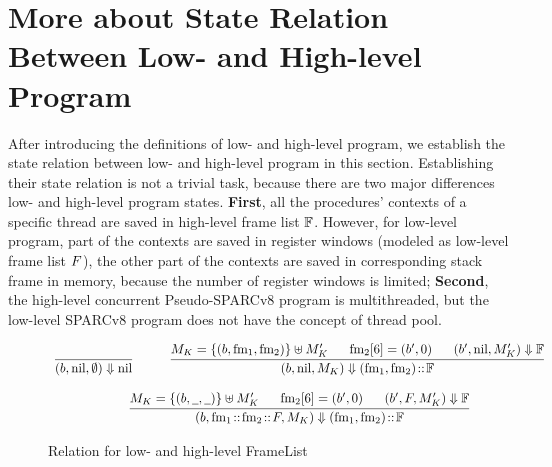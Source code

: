 \section{More about State Relation Between Low- and High-level Program}
\label{sec:more-staterel}

After introducing the definitions of low- and high-level program, 
we establish the state relation between low- and high-level program 
in this section. Establishing their state relation is not a trivial 
task, because there are two major differences low- and high-level 
program states. \textbf{First}, all the procedures' contexts of 
a specific thread are saved in high-level frame list $\mathbb{F}$. 
However, for low-level program, part of the contexts are saved in 
register windows (modeled as low-level frame list $F$), the 
other part of the contexts are saved in corresponding stack frame 
in memory, because the number of register windows is limited; 
\textbf{Second}, the high-level concurrent Pseudo-SPARCv8 program 
is multithreaded, but the low-level SPARCv8 program does not have 
the concept of thread pool. 

\begin{figure}[!h]
    \centering
    \small
    \[
        \begin{array}{c}
            \infer
            {
                \stkRel{(\block, \nil, \emptyset)}{\nil}
            }
            {} \qquad \quad
            \infer
            {
                \stkRel{(\block, \nil, \Mem_K)}{(\fm_1, \fm_2) \stCons \hWstk}
            }
            {
                \Mem_K = \framMem{(\block, \fm_1, \fm_2)} \uplus \Mem_K' 
                \quad \ \ \fm_2[6] = (\block', 0) \quad \ \  
                \stkRel{(\block', \nil, \Mem_K')}{\hWstk}
            } \\
            \\
            \infer
            {
                \stkRel{(\block,
                	\fm_1 \stCons \fm_2 \stCons \Wstack, \Mem_K)}
                    {(\fm_1, \fm_2) \stCons \hWstk}
            }
            {
                \Mem_K = \framMem{(\block, \notCare, \notCare)} \uplus \Mem_K'
                \quad \ \ 
                \fm_2[6] = (\block', 0) \quad \ \ 
                \stkRel{(\block', \Wstack, \Mem_K')}{\hWstk}
            }
        \end{array}
    \]
    \caption{Relation for low- and high-level FrameList}
    \label{fig:relation-low-high-level-framelist}
\end{figure}

